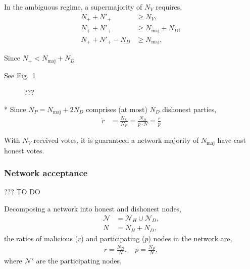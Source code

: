 In the ambiguous regime, a supermajority of $N_V$ requires,
\begin{align}
	N_+ + N'_+ &\geq N_V, \nonumber\\
	N_+ + N'_+ &\geq N_\mathrm{maj} + N_D, \nonumber\\
	N_+ + N'_+ - N_D &\geq N_\mathrm{maj},
\end{align}

Since $N_+ < N_\mathrm{maj} + N_D$

See Fig.~\ref{fig:voting_pie_chart}

\begin{figure}[!htp]
	\centering
	
	\caption{???} \label{fig:voting_pie_chart}
\end{figure}


* Since $N_P = N_\mathrm{maj} + 2 N_D$ comprises (at most) $N_D$ dishonest parties,
\begin{align}
	\dot{r} &= \frac{N_D}{N_P} = \frac{N_D}{p\cdot N} = \frac{r}{p}
\end{align}


%
%



With $N_V$ received votes, it is guaranteed a network majority of $N_\mathrm{maj}$ have cast honest votes.

\subsubsection{Network acceptance}

??? TO DO


Decomposing a network into honest and dishonest nodes,
\begin{align}
	\mathcal{N}   & = \mathcal{N}_H \cup \mathcal{N}_D,\nonumber \\
	N & = N_H + N_D,
\end{align}
the ratios of malicious ($r$) and participating ($p$) nodes in the network are,
\begin{align}
	r = \frac{N_D}{N},\quad p = \frac{N_P}{N},
\end{align}
where $\mathcal{N}'$ are the participating nodes,

